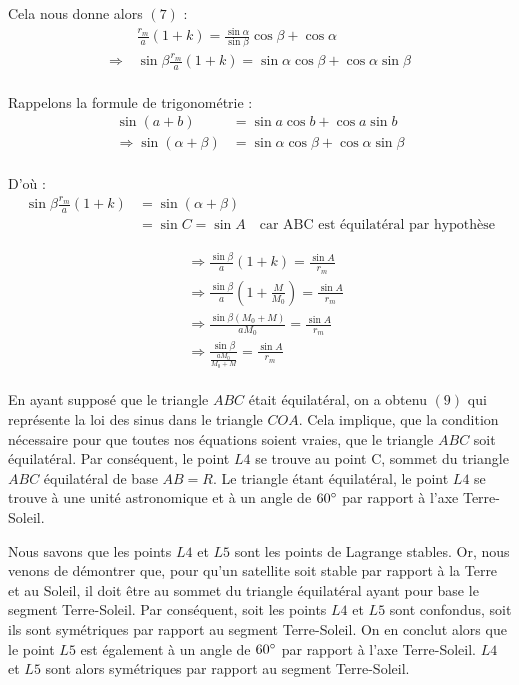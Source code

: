 \documentclass[12pt]{article}
\begin{document}
Cela nous donne alors $(7)$ : 
\begin{align*}
&\frac{r_m}{a}(1+k) = \frac{\sin \alpha}{\sin \beta} \cos \beta + \cos \alpha \\
\Rightarrow \, &\sin \beta \frac{r_m}{a}(1+k) = \sin \alpha \cos \beta + \cos \alpha \sin \beta
\end{align*} \\
Rappelons la formule de trigonométrie : 
\begin{align*}
\sin(a+b) &= \sin a\cos b + \cos a\sin b \\
\Rightarrow \sin(\alpha + \beta) &= \sin\alpha\cos\beta + \cos\alpha\sin\beta
\end{align*} \\
D'où : 
\begin{align*}
  \sin\beta \frac{r_m}{a}(1+k) &= \sin(\alpha+\beta) \\
    &= \sin C = \sin A \quad \text{car ABC est équilatéral par hypothèse}
\end{align*}

\begin{align*}
  &\Rightarrow \frac{\sin \beta}{a}(1+k) = \frac{\sin A}{r_m} \\
  &\Rightarrow \frac{\sin \beta}{a}(1+\frac{M}{M_0}) = \frac{\sin A}{r_m} \\
  &\Rightarrow \frac{\sin \beta (M_0+M)}{aM_0} = \frac{\sin A}{r_m} \\
  &\Rightarrow \boxed{\frac{\sin\beta}{\frac{aM_0}{M_0+M}} = \frac{\sin A}{r_m}} \tag{9}
\end{align*} \\
En ayant supposé que le triangle $ABC$ était équilatéral, on a obtenu $(9)$ qui représente la loi des sinus dans le triangle $COA$. Cela implique, que la condition nécessaire pour que toutes nos équations soient vraies, que le triangle $ABC$ soit équilatéral. Par conséquent, le point $L4$ se trouve au point C, sommet du triangle $ABC$ équilatéral de base $ AB = R$. Le triangle étant équilatéral, le point $L4$ se trouve à une unité astronomique et à un angle de $60\degree$ par rapport à l'axe Terre-Soleil. \par Nous savons que les points $L4$ et $L5$ sont les points de Lagrange stables. Or, nous venons de démontrer que, pour qu'un satellite soit stable par rapport à la Terre et au Soleil, il doit être au sommet du triangle équilatéral ayant pour base le segment Terre-Soleil. Par conséquent, soit les points $L4$ et $L5$ sont confondus, soit ils sont symétriques par rapport au segment Terre-Soleil. 
On en conclut alors que le point $L5$ est également à un angle de $60\degree$ par rapport à l'axe Terre-Soleil. $L4$ et $L5$ sont alors symétriques par rapport au segment Terre-Soleil.
\end{document}
